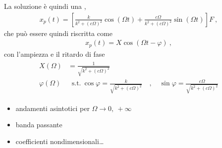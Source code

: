 \documentclass[letterpaper,10pt,italian]{jupyterBook}
\begin{document}
\sphinxAtStartPar
La soluzione è quindi una {\hyperref[\detokenize{ch/trigonometry:math-hs-trigonometry-linear-combination}]{}},
\begin{equation*}
\begin{split}x_p(t) = \left[  \frac{k}{k^2 + (c \Omega)^2} \cos(\Omega t) + \frac{c \Omega}{k^2 + (c \Omega)^2} \sin(\Omega t) \right] F \ ,\end{split}
\end{equation*}
\sphinxAtStartPar
che può essere quindi riscritta come
\begin{equation*}
\begin{split}x_p(t) = X \cos (\Omega t - \varphi) \ ,\end{split}
\end{equation*}
\sphinxAtStartPar
con l’ampiezza e il ritardo di fase
\begin{equation*}
\begin{split}\begin{aligned}
  X(\Omega) & = \frac{1}{\sqrt{k^2 + (c\Omega)^2}} \\
  \varphi(\Omega) & \ \text{ s.t.} \ \cos \varphi = \frac{k}{\sqrt{k^2 + (c\Omega)^2}} \quad , \quad \sin \varphi = \frac{c\Omega}{\sqrt{k^2 + (c\Omega)^2}}
\end{aligned}\end{split}
\end{equation*}
\sphinxAtStartPar
{} 
\begin{itemize}
\item {} 
\sphinxAtStartPar
andamenti asintotici per \(\Omega \rightarrow 0, \ +\infty\)

\item {} 
\sphinxAtStartPar
banda passante

\item {} 
\sphinxAtStartPar
coefficienti non\sphinxhyphen{}dimensionali…

\end{itemize}
\end{document}
